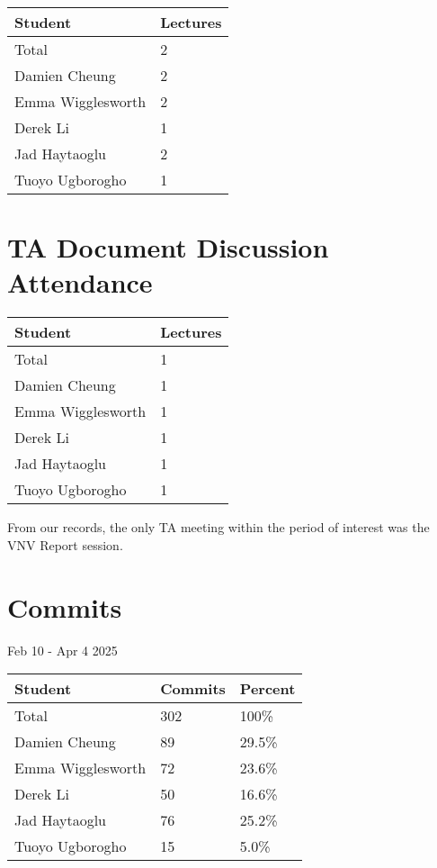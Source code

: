 \documentclass{article}
\begin{document}
\begin{table}[H]
\centering
\begin{tabular}{ll}
\toprule
\textbf{Student} & \textbf{Lectures}\\
\midrule
Total & 2\\
Damien Cheung & 2\\
Emma Wigglesworth & 2\\
Derek Li & 1\\
Jad Haytaoglu & 2\\
Tuoyo Ugborogho & 1\\
\bottomrule
\end{tabular}
\end{table}

\section{TA Document Discussion Attendance}

\begin{table}[H]
\centering
\begin{tabular}{ll}
\toprule
\textbf{Student} & \textbf{Lectures}\\
\midrule
Total & 1\\
Damien Cheung & 1\\
Emma Wigglesworth & 1\\
Derek Li & 1\\
Jad Haytaoglu & 1\\
Tuoyo Ugborogho & 1\\
\bottomrule
\end{tabular}
\end{table}

From our records, the only TA meeting within the period of interest was the VNV Report session.

\section{Commits}

Feb 10 - Apr 4 2025

\begin{table}[H]
\centering
\begin{tabular}{lll}
\toprule
\textbf{Student} & \textbf{Commits} & \textbf{Percent}\\
\midrule
Total & 302 & 100\% \\
Damien Cheung & 89 & 29.5\% \\
Emma Wigglesworth & 72 & 23.6\% \\
Derek Li & 50 & 16.6\% \\
Jad Haytaoglu & 76 & 25.2\% \\
Tuoyo Ugborogho & 15 & 5.0\% \\
\bottomrule
\end{tabular}
\end{table}
\end{document}
